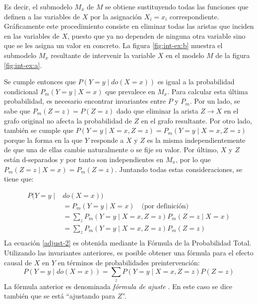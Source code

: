 Es decir, el submodelo $M_x$ de $M$ se obtiene sustituyendo todas las funciones que definen a las variables de $X$ por la asignación $X_i=x_i$ correspondiente. Gráficamente este procedimiento consiste en eliminar todas las aristas que inciden en las variables de $X$, puesto que ya no dependen de ninguna otra variable sino que se les asigna un valor en concreto. La figura \ref{fig:int-ex:b} muestra el submodelo $M_x$ resultante de intervenir la variable $X$ en el modelo $M$ de la figura \ref{fig:int-ex:a}.

Se cumple entonces que $P(Y=y \mid do(X=x))$ es igual a la probabilidad condicional $P_m(Y=y \mid X=x)$ que prevalece en $M_x$. Para calcular esta última probabilidad, es necesario encontrar invariantes entre $P$ y $P_m$. Por un lado, se sabe que $P_m(Z=z) = P(Z=z)$ dado que eliminar la arista $Z \rightarrow X$ en el grafo original no afecta la probabilidad de $Z$ en el grafo resultante. Por otro lado, también se cumple que $P(Y=y \mid X=x, Z=z) = P_m(Y=y \mid X=x,Z=z)$ porque la forma en la que $Y$ responde a $X$ y $Z$ es la misma independientemente de que una de ellas cambie naturalmente o se fije su valor. Por último, $X$ y $Z$ están d-separados y por tanto son independientes en $M_x$, por lo que $P_m(Z=z \mid X=x)=P_m(Z=z)$. Juntando todas estas consideraciones, se tiene que:

\begin{align}
	P(Y=y \mid & do(X=x))\\
	&= P_m(Y=y \mid X=x) \quad \text{(por definición)}\\
	&= \sum_{z}P_m(Y=y \mid X=x,Z=z)P_m(Z=z \mid X=x)\label{adjust-2}\\
	&= \sum_{z}P_m(Y=y \mid X=x,Z=z)P_m(Z=z)\label{adjust-3}\\
\end{align}
La ecuación \ref{adjust-2} es obtenida mediante la Fórmula de la Probabilidad Total. Utilizando las invariantes anteriores, es posible obtener una fórmula para el efecto causal de $X$ en $Y$ en términos de probabilidades preintervención:
\begin{equation}
	P(Y=y \mid do(X=x)) = \sum_{z}P(Y=y \mid X=x,Z=z)P(Z=z) 
\end{equation}
La fórmula anterior es denominada \textit{fórmula de ajuste} \cite{pearl2016causal}. En este caso se dice también que se está \textquotedblleft ajustando para $Z$\textquotedblright.		

